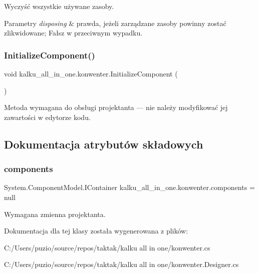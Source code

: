 Wyczyść wszystkie używane zasoby. 


\begin{DoxyParams}{Parametry}
{\em disposing} & prawda, jeżeli zarządzane zasoby powinny zostać zlikwidowane; Fałsz w przeciwnym wypadku.\\
\hline
\end{DoxyParams}
\mbox{\label{classkalku__all__in__one_1_1konwenter_a4cac899b93cc3b33e6fddc25f67d4e9f}} 
\subsubsection{\texorpdfstring{InitializeComponent()}{InitializeComponent()}}
{\footnotesize\ttfamily void kalku\+\_\+all\+\_\+in\+\_\+one.\+konwenter.\+Initialize\+Component (\begin{DoxyParamCaption}{ }\end{DoxyParamCaption})\hspace{0.3cm}{\ttfamily [private]}}



Metoda wymagana do obsługi projektanta — nie należy modyfikować jej zawartości w edytorze kodu. 



\subsection{Dokumentacja atrybutów składowych}
\mbox{\label{classkalku__all__in__one_1_1konwenter_a406b6efe79f830bd77c75f2fef0dbc5c}} 
\subsubsection{\texorpdfstring{components}{components}}
{\footnotesize\ttfamily System.\+Component\+Model.\+I\+Container kalku\+\_\+all\+\_\+in\+\_\+one.\+konwenter.\+components = null\hspace{0.3cm}{\ttfamily [private]}}



Wymagana zmienna projektanta. 



Dokumentacja dla tej klasy została wygenerowana z plików\+:\begin{DoxyCompactItemize}
\item 
C\+:/\+Users/puzio/source/repos/taktak/kalku all in one/konwenter.\+cs\item 
C\+:/\+Users/puzio/source/repos/taktak/kalku all in one/konwenter.\+Designer.\+cs\end{DoxyCompactItemize}

